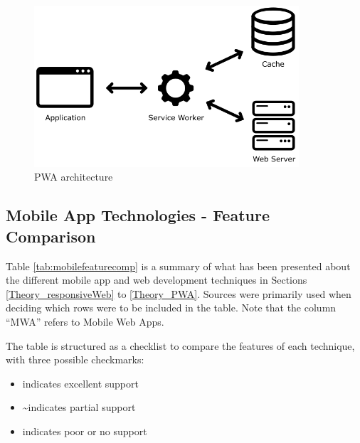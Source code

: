 \documentclass[a4paper,12pt]{article}
\newcommand{\cmark}{\ding{51}}
\newcommand{\xmark}{\ding{55}}
\begin{document}
\begin{figure}[h]%
	\centering
	\includegraphics[height=6cm]{img/Other/struct_pwa.png}
	\caption{PWA architecture}%
	\label{fig:pwaapp}%
\end{figure}

\subsection{Mobile App Technologies - Feature Comparison}
\label{Theory_featureComparison}
Table \ref{tab:mobilefeaturecomp} is a summary of what has been presented about the different mobile app and web development techniques in Sections \ref{Theory_responsiveWeb} to \ref{Theory_PWA}. Sources \cite{mobile_web_apps_2013, dawning_of_pwa, pwa_in_modern_webdeb} were primarily used when deciding which rows were to be included in the table. Note that the column “MWA” refers to Mobile Web Apps.

The table is structured as a checklist to compare the features of each technique, with three possible checkmarks:

\begin{itemize}
    \item[] \cmark \quad indicates excellent support
    \item[] \textasciitilde \quad indicates partial support
    \item[] \xmark \quad indicates poor or no support
\end{itemize}
\end{document}
